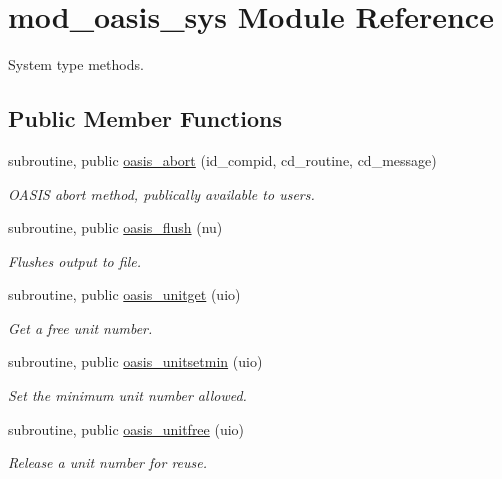 \hypertarget{classmod__oasis__sys}{\section{mod\+\_\+oasis\+\_\+sys Module Reference}
\label{classmod__oasis__sys}
}


System type methods.  


\subsection*{Public Member Functions}
\begin{DoxyCompactItemize}
\item 
subroutine, public \hyperlink{classmod__oasis__sys_ae6bc2703e627d5a9491338c9569f8f4e}{oasis\+\_\+abort} (id\+\_\+compid, cd\+\_\+routine, cd\+\_\+message)
\begin{DoxyCompactList}\small\item\em O\+A\+S\+I\+S abort method, publically available to users. \end{DoxyCompactList}\item 
subroutine, public \hyperlink{classmod__oasis__sys_ad152b6f737a7e06f8f1226af23d66361}{oasis\+\_\+flush} (nu)
\begin{DoxyCompactList}\small\item\em Flushes output to file. \end{DoxyCompactList}\item 
subroutine, public \hyperlink{classmod__oasis__sys_abce4c06d8a999919a2a185c71ab15edd}{oasis\+\_\+unitget} (uio)
\begin{DoxyCompactList}\small\item\em Get a free unit number. \end{DoxyCompactList}\item 
subroutine, public \hyperlink{classmod__oasis__sys_a063a41b73546564afd294fd5708b6667}{oasis\+\_\+unitsetmin} (uio)
\begin{DoxyCompactList}\small\item\em Set the minimum unit number allowed. \end{DoxyCompactList}\item 
subroutine, public \hyperlink{classmod__oasis__sys_a892ed9f46e2e8f577f1a2670f74695d6}{oasis\+\_\+unitfree} (uio)
\begin{DoxyCompactList}\small\item\em Release a unit number for reuse. \end{DoxyCompactList}\item 

\end{DoxyCompactItemize}
